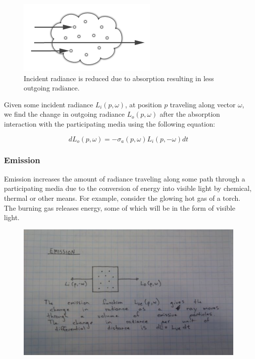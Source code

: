 \documentclass{article}
\begin{document}
\begin{figure}[h!]
	\centering
	\includegraphics[scale=0.75]{Images/Absorption}
	\caption{Incident radiance is reduced due to absorption resulting in less outgoing radiance.}
\end{figure}

Given some incident radiance $L_{i}(p,\omega)$, at position $p$ traveling along vector $\omega$, we find the change in outgoing radiance $L_{o}(p,\omega)$ after the absorption interaction with the participating media using the following equation:

\begin{equation}
dL_{o}(p,\omega) = -\sigma_{a}(p,\omega)L_{i}(p,-\omega) dt
\end{equation}

\subsubsection{Emission}

Emission increases the amount of radiance traveling along some path through a participating media due to the conversion of energy into visible light by chemical, thermal or other means. For example, consider the glowing hot gas of a torch. The burning gas releases energy, some of which will be in the form of visible light.

\begin{figure}[h!]
	\centering
	\includegraphics[scale=0.5]{Images/Emission}
\end{figure}
\end{document}
